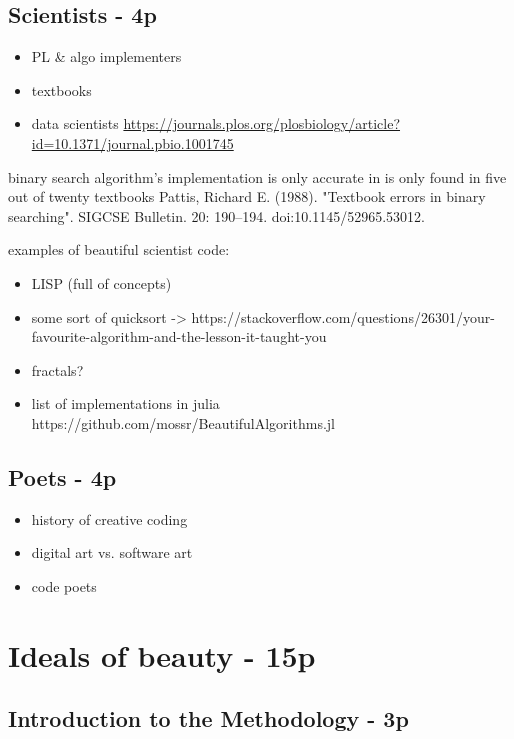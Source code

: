 \subsection{Scientists - 4p}

\begin{itemize}
    \item PL \& algo implementers
    \item textbooks
    \item data scientists \url{https://journals.plos.org/plosbiology/article?id=10.1371/journal.pbio.1001745}
\end{itemize}

binary search algorithm's implementation is only accurate in  is only found in five out of twenty textbooks Pattis, Richard E. (1988). "Textbook errors in binary searching". SIGCSE Bulletin. 20: 190–194. doi:10.1145/52965.53012.

examples of beautiful scientist code:

\begin{itemize}
    \item LISP (full of concepts)
    \item some sort of quicksort -> https://stackoverflow.com/questions/26301/your-favourite-algorithm-and-the-lesson-it-taught-you
    \item fractals?
    \item list of implementations in julia https://github.com/mossr/BeautifulAlgorithms.jl
\end{itemize}


\subsection{Poets - 4p}

\begin{itemize}
    \item history of creative coding
    \item digital art vs. software art
    \item code poets
\end{itemize}


\section{Ideals of beauty - 15p}

\subsection{Introduction to the Methodology - 3p}

